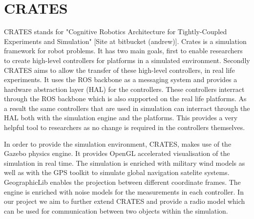 \section{CRATES}
CRATES stands for "Cognitive Robotics Architecture for Tightly-Coupled
Experiments and Simulation" [Site at bitbucket (andrew)]. Crates is a simulation
framework for robot problems. It has two main goals, first to enable researchers
to create high-level controllers for platforms in a simulated environment.
Secondly CRATES aims to allow the transfer of these high-level controllers, in
real life experiments. It uses the ROS backbone as a messaging system and
provides a hardware abstraction layer (HAL) for the controllers. These
controllers interract through the ROS backbone which is also supported on the
real life platforms. As a result the same controllers that are used in
simulation can interract through the HAL both with the simulation engine and the
platforms. This provides a very helpful tool to researchers as no change is
required in the controllers themselves.

In order to provide the simulation environment, CRATES, makes use of the Gazebo
physics engine. It provides OpenGL accelerated visualisation of the simulation
in real time. The simulation is enriched with military wind models as well as
with the GPS toolkit to simulate global navigation satelite systems.
GeographicLib enables the projection between different coordinate frames. The
engine is enriched with noise models for the measurements in each controller. In
our project we aim to further extend CRATES and provide a radio model which can
be used for communication between two objects within the simulation.


